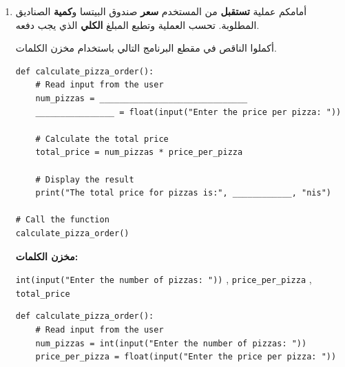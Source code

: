 \documentclass[14pt]{extarticle}
\begin{document}
\begin{enumerate}[label=\textbf{تمرين \arabic*:}, wide=0pt, itemsep=2.2em]
\begin{boxSolution}
لاحظوا أنّ ناتج العامل \textenglish{/} هو دائمًا من نمط \textenglish{float} (لذلك المخرج في البند 1 هو \textenglish{78.0} وليس \textenglish{78})، بينما ناتج العامل \textenglish{//} على عددين صحيحين هو عدد صحيح.
\end{boxSolution}

\fi
\filbreak


\item أمامكم عملية \textbf{تستقبل} من المستخدم \textbf{سعر} صندوق البيتسا و\textbf{كمية} الصناديق المطلوبة. تحسب العملية وتطبع المبلغ \textbf{الكلي} الذي يجب دفعه.

أكملوا الناقص في مقطع البرنامج التالي باستخدام مخزن الكلمات.

\begin{boxCode}
\begin{english}
\begin{verbatim}
def calculate_pizza_order():
    # Read input from the user
    num_pizzas = ______________________________
    ________________ = float(input("Enter the price per pizza: "))

    # Calculate the total price
    total_price = num_pizzas * price_per_pizza

    # Display the result
    print("The total price for pizzas is:", ____________, "nis")

# Call the function
calculate_pizza_order()
\end{verbatim}
\end{english}
\end{boxCode}

\textbf{مخزن الكلمات:}
\begin{center}
\begin{english}
\begin{boxCode}
\texttt{int(input("Enter the number of pizzas: "))} \quad , \quad \texttt{price\_per\_pizza} \quad , \quad \texttt{total\_price}
\end{boxCode}
\end{english}
\end{center}

\ifwithsols
\begin{boxSolution}
\begin{english}
\begin{verbatim}
def calculate_pizza_order():
    # Read input from the user
    num_pizzas = int(input("Enter the number of pizzas: "))
    price_per_pizza = float(input("Enter the price per pizza: "))


\end{verbatim}
\end{english}
\end{boxSolution}
\end{enumerate}
\end{document}
